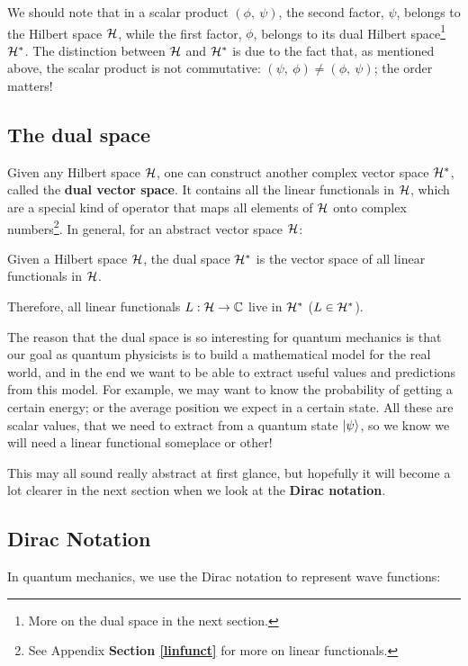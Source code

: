 We should note that in a scalar product $(\phi, \ \psi)$, the second factor, $\psi$, belongs to the Hilbert space $\mathcal{H}$, while the first factor, $\phi$, belongs to its dual Hilbert space\footnote{More on the dual space in the next section.} $\mathcal{H}^*$. The distinction between $\mathcal{H}$ and $\mathcal{H}^*$ is due to the fact that, as mentioned above, the scalar product is not commutative: $(\psi, \ \phi) \neq (\phi, \ \psi)$; the order matters!

\subsection{The dual space} \label{dualspace}

Given any Hilbert space $\mathcal{H}$, one can construct another complex vector space $\mathcal{H}^*$, called the \textbf{dual vector space}. It contains all the linear functionals in $\mathcal{H}$, which are a special kind of operator that maps all elements of $\mathcal{H}$ onto complex numbers\footnote{See Appendix \textbf{Section \ref{linfunct}} for more on linear functionals.}. In general, for an abstract vector space $\mathcal{H}$:

\begin{definition}
    Given a Hilbert space $\mathcal{H}$, the dual space $\mathcal{H}^*$ is the vector space of all linear functionals in $\mathcal{H}$.
\end{definition}

Therefore, all linear functionals $L: \mathcal{H}\to \mathbb{C}$ live in $\mathcal{H}^*$ ($L\in \mathcal{H}^*$).

The reason that the dual space is so interesting for quantum mechanics is that our goal as quantum physicists is to build a mathematical model for the real world, and in the end we want to be able to extract useful values and predictions from this model. For example, we may want to know the probability of getting a certain energy; or the average position we expect in a certain state. All these are scalar values, that we need to extract from a quantum state $\ket{\psi}$, so we know we will need a linear functional someplace or other!

This may all sound really abstract at first glance, but hopefully it will become a lot clearer in the next section when we look at the \textbf{Dirac notation}.

\subsection{Dirac Notation}

In quantum mechanics, we use the Dirac notation to represent wave functions:

